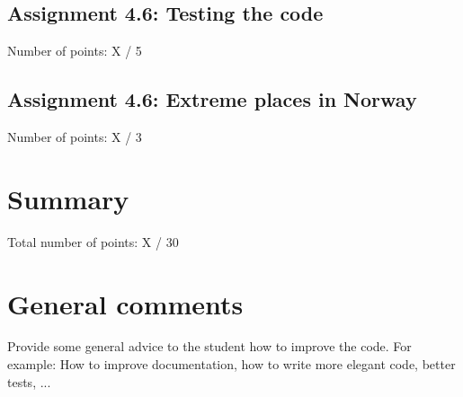 \documentclass[a4paper]{article}
\begin{document}
\subsection*{Assignment 4.6: Testing the code}
Number of points: X / 5
\subsection*{Assignment 4.6: Extreme places in Norway}
Number of points: X / 3

\section{Summary}

Total number of points: X / 30


\section{General comments}
Provide some general advice to the student how to improve the code. For example:
How to improve documentation, how to write more elegant code, better tests, ...




\end{document}
